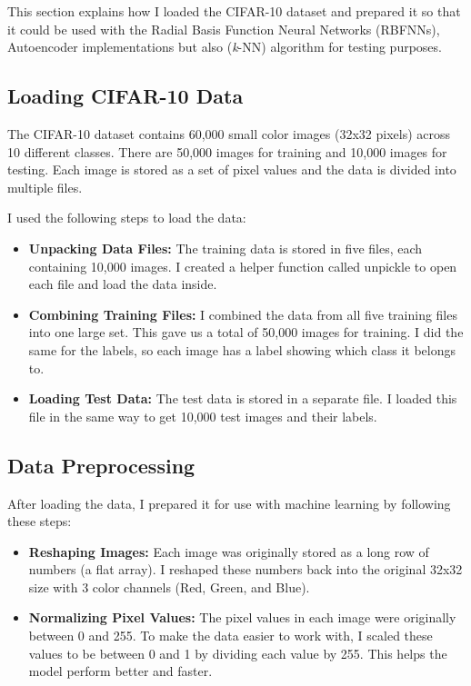 \documentclass[lettersize,journal]{IEEEtran}
\begin{document}
This section explains how I loaded the CIFAR-10 dataset and prepared it so that it could be used with the Radial Basis Function Neural Networks (RBFNNs), Autoencoder implementations but also (\textit{k}-NN) algorithm for testing purposes.

\subsection{\textbf{Loading CIFAR-10 Data}}
The CIFAR-10 dataset contains 60,000 small color images (32x32 pixels) across 10 different classes. There are 50,000 images for training and 10,000 images for testing. Each image is stored as a set of pixel values and the data is divided into multiple files.

I used the following steps to load the data:
\begin{itemize}
    \item \textbf{Unpacking Data Files:} The training data is stored in five files, each containing 10,000 images. I created a helper function called unpickle to open each file and load the data inside.
    \item \textbf{Combining Training Files:} I combined the data from all five training files into one large set. This gave us a total of 50,000 images for training. I did the same for the labels, so each image has a label showing which class it belongs to.
    \item \textbf{Loading Test Data:} The test data is stored in a separate file. I loaded this file in the same way to get 10,000 test images and their labels.
\end{itemize}

\subsection{\textbf{Data Preprocessing}}
After loading the data, I prepared it for use with machine learning by following these steps:

\begin{itemize}
    \item \textbf{Reshaping Images:} Each image was originally stored as a long row of numbers (a flat array). I reshaped these numbers back into the original 32x32 size with 3 color channels (Red, Green, and Blue).
    \item \textbf{Normalizing Pixel Values:} The pixel values in each image were originally between 0 and 255. To make the data easier to work with, I scaled these values to be between 0 and 1 by dividing each value by 255. This helps the model perform better and faster.
\end{itemize}
\end{document}
